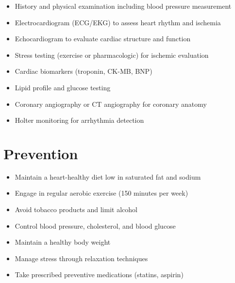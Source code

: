 \begin{itemize}[noitemsep]
  \item History and physical examination including blood pressure measurement
  \item Electrocardiogram (ECG/EKG) to assess heart rhythm and ischemia
  \item Echocardiogram to evaluate cardiac structure and function
  \item Stress testing (exercise or pharmacologic) for ischemic evaluation
  \item Cardiac biomarkers (troponin, CK-MB, BNP)
  \item Lipid profile and glucose testing
  \item Coronary angiography or CT angiography for coronary anatomy
  \item Holter monitoring for arrhythmia detection
\end{itemize}
\section{Prevention}
\begin{itemize}[noitemsep]
  \item Maintain a heart-healthy diet low in saturated fat and sodium
  \item Engage in regular aerobic exercise (150 minutes per week)
  \item Avoid tobacco products and limit alcohol
  \item Control blood pressure, cholesterol, and blood glucose
  \item Maintain a healthy body weight
  \item Manage stress through relaxation techniques
  \item Take prescribed preventive medications (statins, aspirin)
\end{itemize}
